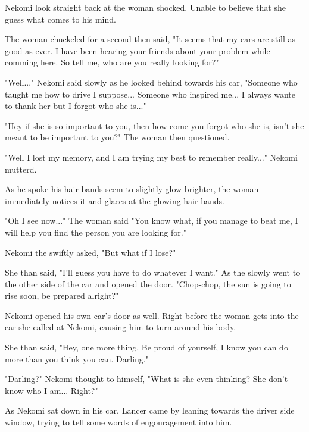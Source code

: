 Nekomi look straight back at the woman shocked. Unable to believe that she guess what comes to his mind.

The woman chuckeled for a second then said, "It seems that my ears are still as good as ever. I have been hearing your friends about your problem while comming here. So tell me, who are you really looking for?"

"Well..." Nekomi said slowly as he looked behind towards his car, "Someone who taught me how to drive I suppose... Someone who inspired me... I always wante to thank her but I forgot who she is..."

"Hey if she is so important to you, then how come you forgot who she is, isn't she meant to be important to you?" The woman then questioned.

"Well I lost my memory, and I am trying my best to remember really..." Nekomi mutterd.

As he spoke his hair bands seem to slightly glow brighter, the woman immediately notices it and glaces at the glowing hair bands.

"Oh I see now..." The woman said "You know what, if you manage to beat me, I will help you find the person you are looking for."

Nekomi the swiftly asked, "But what if I lose?"

She than said, "I'll guess you have to do whatever I want." As the slowly went to the other side of the car and opened the door. "Chop-chop, the sun is going to rise soon, be prepared alright?"

Nekomi opened his own car's door as well. Right before the woman gets into the car she called at Nekomi, causing him to turn around his body.

She than said, "Hey, one more thing. Be proud of yourself, I know you can do more than you think you can. Darling."

"Darling?" Nekomi thought to himself, "What is she even thinking? She don't know who I am... Right?"

As Nekomi sat down in his car, Lancer came by leaning towards the driver side window, trying to tell some words of engouragement into him.